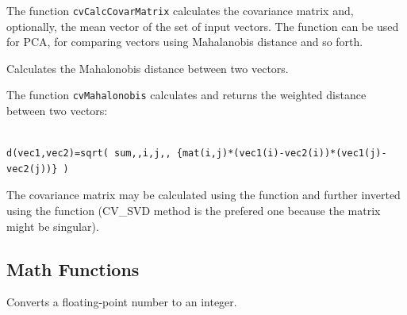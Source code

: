 The function \texttt{cvCalcCovarMatrix} calculates the covariance matrix
and, optionally, the mean vector of the set of input vectors. The function
can be used for PCA, for comparing vectors using Mahalanobis distance and so forth.

\label{Mahalonobis}

Calculates the Mahalonobis distance between two vectors.


\begin{description}
\end{description}


The function \texttt{cvMahalonobis} calculates and returns the weighted distance between two vectors:

\begin{lstlisting}

d(vec1,vec2)=sqrt( sum,,i,j,, {mat(i,j)*(vec1(i)-vec2(i))*(vec1(j)-vec2(j))} )

\end{lstlisting}

The covariance matrix may be calculated using the  function and further inverted using the  function (CV\_SVD method is the prefered one because the matrix might be singular).


\subsection{Math Functions}

\label{Round, Floor, Ceil}

Converts a floating-point number to an integer.


\begin{description}
\end{description}


